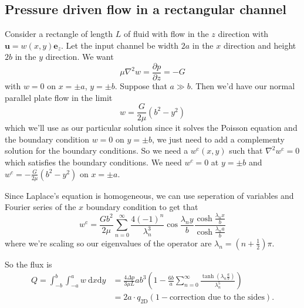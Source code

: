 \documentclass{article}
\begin{document}
\subsection{Pressure driven flow in a rectangular channel}
Consider a rectangle of length $ L $ of fluid with flow in the $ z $ direction with $ \mathbf u = w(x,y)\mathbf e_z $. Let the input channel be width $ 2a $ in the $ x $ direction and height $ 2b $ in the $ y $ direction. We want
\[
	\mu \nabla^2 w = \frac{\partial p}{\partial z} = - G
\]
with $  w = 0 $ on $ x = \pm a $, $ y= \pm b $. Suppose that $ a\gg b $. Then we'd have our normal parallel plate flow in the limit
\[
	w = \frac {G}{2\mu}(b^2-y^2)
\]
which we'll use as our particular solution since it solves the Poisson equation and the boundary condition $ w=0 $ on $ y=\pm b $, we just need to add a complementy solution for the boundary conditions. So we need a $ w^{\mathrm c}(x,y) $ such that $ \nabla^2 w^{\mathrm c} = 0 $ which satisfies the boundary conditions. We need $ w^c = 0 $ at $ y=\pm b $ and $ w^c = -\frac G{2\mu}(b^2-y^2) $ on $ x = \pm a $.\par
Since Laplace's equation is homogeneous, we can use seperation of variables and Fourier series of the $ x $ boundary condition to get that
\[
	w^{\mathrm c} = \frac{Gb^2}{2\mu}\sum_{n=0}^\infty\frac{4(-1)^n}{\lambda_n^3} \cos\frac{\lambda_n y}b\frac{\cosh\frac{\lambda_n x}b}{\cosh\frac{\lambda_n a}{b}}
\]
where we're scaling so our eigenvalues of the operator are $ \lambda_n = \left(n+\frac 12 \right)\pi $.\par
So the flux is
\begin{align*}
	Q = \int_{-b}^b \int_{-a}^a w \ \mathrm dx\mathrm dy &= \frac{4\Delta p}{3\mu L} ab^3\left(1 - \frac{6b}a \sum_{n=0}^\infty \frac{\tanh\left(\lambda_n \frac ab\right)}{\lambda_n^5}\right) \\
							     &= 2a\cdot q_{\text{2D}}\left(1- \text{correction due to the sides}\right).
\end{align*}
\end{document}
